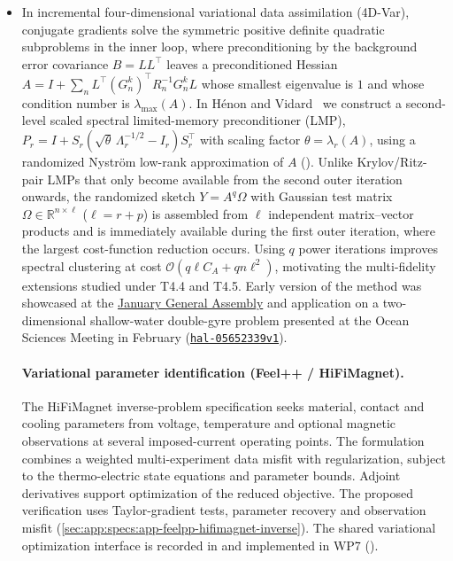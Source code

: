 \begin{itemize}
\item[T4.1] \label{sec:wp4:double-gyre}%
  In incremental four-dimensional variational data assimilation (4D-Var),
  conjugate gradients solve the symmetric positive definite quadratic subproblems
  in the inner loop, where preconditioning by the background error covariance
  $B = L L^\top$ leaves a preconditioned Hessian $A = I + \sum_n L^\top (G_n^k)^\top R_n^{-1} G_n^k L$
  whose smallest eigenvalue is $1$ and whose condition number is $\lambda_{\max}(A)$. In
  Hénon and Vidard~\cite{hal-05874752} we construct a second-level scaled
  spectral limited-memory preconditioner (LMP),
  $P_r = I + S_r(\sqrt{\theta}\,\Lambda_r^{-1/2} - I_r)S_r^\top$ with scaling factor
  $\theta = \lambda_r(A)$, using a randomized Nyström low-rank approximation of $A$
  (). Unlike Krylov/Ritz-pair LMPs that only become
  available from the second outer iteration onwards, the randomized sketch $Y = A^q\Omega$
  with Gaussian test matrix $\Omega \in \mathbb{R}^{n\times \ell}$ ($\ell = r + p$)
  is assembled from $\ell$ independent matrix--vector products and is immediately
  available during the first outer iteration, where the largest cost-function reduction
  occurs. Using $q$ power iterations improves spectral clustering at cost
  $\mathcal{O}(q\ell C_A + qn\ell^2)$, motivating the multi-fidelity extensions studied
  under T4.4 and T4.5. Early version of the method was showcased at the
  \href{https://exa-ma.numpex.fr/news/2026/20260119-21-ag.html}{January General Assembly}
  and application on a two-dimensional shallow-water
  double-gyre problem presented at the Ocean Sciences Meeting in February
  (\href{https://hal.science/hal-05652339v1}{\texttt{hal-05652339v1}}).

  \paragraph{Variational parameter identification (Feel++ / HiFiMagnet).}
  The HiFiMagnet inverse-problem specification seeks material, contact and
  cooling parameters from voltage, temperature and optional magnetic
  observations at several imposed-current operating points. The formulation
  combines a weighted multi-experiment data misfit with regularization,
  subject to the thermo-electric state equations and parameter bounds.
  Adjoint derivatives support optimization of the reduced objective.
  The proposed verification uses Taylor-gradient tests, parameter
  recovery and observation misfit
  (\cref{sec:app:specs:app-feelpp-hifimagnet-inverse}).
  The shared variational optimization interface is recorded in
   and implemented in WP7
  ().
  

\end{itemize}

